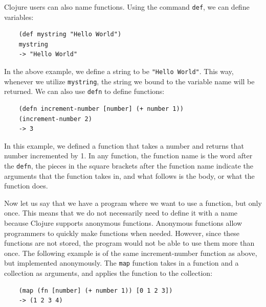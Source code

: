 \documentclass[12pt]{article}
\newcommand{\comment}[1]{{\bf \tt  {#1}}}
\newcommand{\emcomment}[1]{\textcolor{ForestGreen}{\comment{Elena: {#1}}}}
\begin{document}

Clojure users can also name functions.
Using the command \texttt{def}, we can define variables:
\begin{verbatim}
	(def mystring "Hello World")
	mystring
	-> "Hello World"
\end{verbatim}

In the above example, we define a string to be \texttt{"Hello World"}. This way, whenever we utilize 
\texttt{mystring}, the string we bound to the variable name will be returned. We can also use
\texttt{defn} to define functions:
\begin{verbatim}
	(defn increment-number [number] (+ number 1))
	(increment-number 2)
	-> 3
\end{verbatim}

In this example, we defined
a function that takes a number and returns that number incremented by 1.
In any function, the function name is the word after the \texttt{defn}, the pieces in the square
brackets after the function name indicate 
the arguments that the function takes in, and what follows is the body, or what the function does.

Now let us say that we have a program where we want to use a function, but only once. This means that
we do not necessarily need to define it with a name because Clojure supports anonymous functions.
Anonymous functions allow programmers to quickly make
functions when needed. 
However, since these functions are not  stored, the program would not be able to use them more than
once. 
The following example is of the same increment-number function as above, but implemented anonymously.
The \texttt{map} function takes in a function and a collection as arguments, and applies the function
to the collection: 
\begin{verbatim}
	(map (fn [number] (+ number 1)) [0 1 2 3])
	-> (1 2 3 4)
\end{verbatim}
\end{document}
